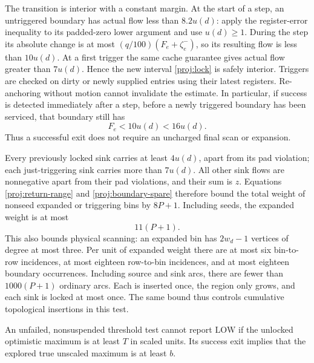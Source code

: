 The transition is interior with a constant margin.  At the start
of a step, an untriggered boundary has actual flow less than
\(8.2u(d)\): apply the register-error inequality to its
padded-zero lower argument and use \(u(d)\ge1\).
During the step its absolute change is at most
\((q/100)(F_e+\zeta_e^-)\), so its resulting flow is less than
\(10u(d)\).  At a first trigger the same cache guarantee gives
actual flow greater than \(7u(d)\).  Hence the new interval
\eqref{proj:lock} is safely interior.  Triggers are checked on
dirty or newly supplied entries using their latest registers.
Re-anchoring without motion cannot invalidate the estimate.
In particular, if success is detected immediately after a step,
before a newly triggered boundary has been serviced, that boundary
still has
\begin{equation}
\label{proj:unserviced-exit}
                              F_e<10u(d)<16u(d).
\end{equation}
Thus a successful exit does not require an uncharged final scan or
expansion.

Every previously locked sink carries at least \(4u(d)\), apart
from its pad violation; each just-triggering sink carries more
than \(7u(d)\).  All other sink flows are nonnegative apart from
their pad violations, and their sum is \(z\).  Equations
\eqref{proj:return-range} and \eqref{proj:boundary-spare} therefore
bound the total weight of nonseed expanded or triggering bins by
\(8P+1\).  Including seeds, the expanded weight is at most
\begin{equation}
\label{proj:region-size}
                              11(P+1).
\end{equation}
This also bounds physical scanning: an expanded bin has \(2w_d-1\)
vertices of degree at most three.  Per unit of expanded weight
there are at most six bin-to-row incidences, at most eighteen
row-to-bin incidences, and at most eighteen boundary occurrences.
Including source and sink arcs, there are fewer than
\(1000(P+1)\) ordinary arcs.  Each is inserted once, the region only
grows, and each sink is locked at most once.  The same bound thus
controls cumulative topological insertions in this test.

\begin{lemma}
\label{proj:threshold}
An unfailed, nonsuspended threshold test cannot report
\(\mathrm{LOW}\) if the unlocked optimistic maximum is at least
\(T\) in scaled units.  Its success exit implies that the explored
true unscaled maximum is at least \(b\).
\end{lemma}

